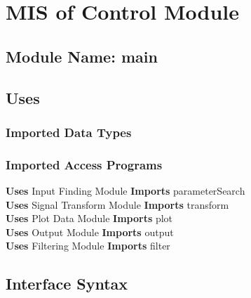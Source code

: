 \documentclass[12pt]{article}
\begin{document}
\section{MIS of Control Module}

\subsection{Module Name: main}

\subsection{Uses}



\subsubsection{Imported Data Types}


\subsubsection{Imported Access Programs}
\textbf{Uses} Input Finding Module \textbf{Imports} parameterSearch\\
\textbf{Uses} Signal Transform Module \textbf{Imports} transform\\
\textbf{Uses} Plot Data Module \textbf{Imports} plot\\
\textbf{Uses} Output Module \textbf{Imports} output\\
\textbf{Uses} Filtering Module \textbf{Imports} filter\\

\subsection{Interface Syntax}

\end{document}
